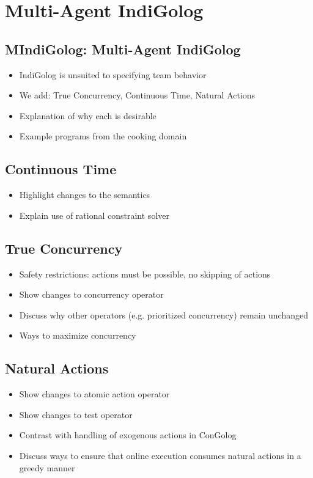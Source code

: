 \chapter{Multi-Agent IndiGolog}\label{ch:mindigolog}

\section{MIndiGolog: Multi-Agent IndiGolog}
\begin{itemize}
\item IndiGolog is unsuited to specifying team behavior
\item We add: True Concurrency, Continuous Time, Natural Actions
\item Explanation of why each is desirable
\item Example programs from the cooking domain
\end{itemize}

\section{Continuous Time}
\begin{itemize}
\item Highlight changes to the semantics
\item Explain use of rational constraint solver
\end{itemize}

\section{True Concurrency}
\begin{itemize}
\item Safety restrictions: actions must be possible, no skipping of actions
\item Show changes to concurrency operator
\item Discuss why other operators (e.g. prioritized concurrency) remain unchanged
\item Ways to maximize concurrency
\end{itemize}

\section{Natural Actions}
\begin{itemize}
\item Show changes to atomic action operator
\item Show changes to test operator
\item Contrast with handling of exogenous actions in ConGolog
\item Discuss ways to ensure that online execution consumes natural actions
in a greedy manner
\end{itemize}

